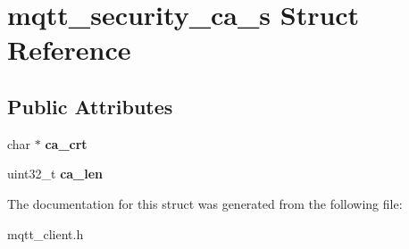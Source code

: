\hypertarget{structmqtt__security__ca__s}{}\section{mqtt\+\_\+security\+\_\+ca\+\_\+s Struct Reference}
\label{structmqtt__security__ca__s}
\subsection*{Public Attributes}
\begin{DoxyCompactItemize}
\item 
\mbox{\label{structmqtt__security__ca__s_a8442e02e3d5908903c4ccd7d87b42660}} 
char $\ast$ {\bfseries ca\+\_\+crt}
\item 
\mbox{\label{structmqtt__security__ca__s_a714d519d8d2d1bfbc7f8c6d8f276887c}} 
uint32\+\_\+t {\bfseries ca\+\_\+len}
\end{DoxyCompactItemize}


The documentation for this struct was generated from the following file\+:\begin{DoxyCompactItemize}
\item 
mqtt\+\_\+client.\+h\end{DoxyCompactItemize}

